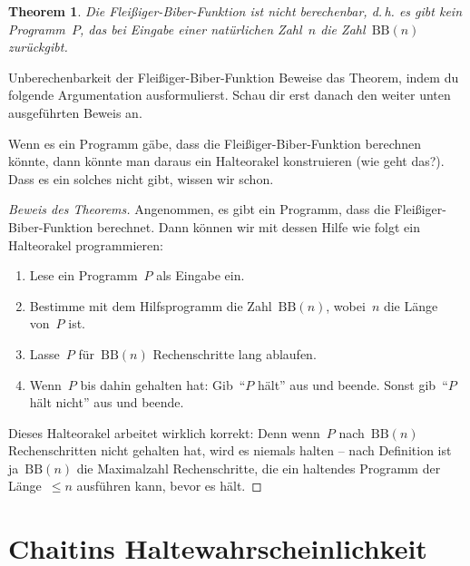 \documentclass[twoside]{../zirkelblatt1415}
\theoremstyle{definition}
\theoremstyle{plain}
\newtheorem{thm}[defn]{Theorem}
\theoremstyle{remark}
\newenvironment{listing}{
  \renewcommand*\theenumi{\arabic{enumi}}
  \renewcommand{\labelenumi}{\theenumi.}
  \begin{enumerate}\itemsep0em}{\end{enumerate}}
\newcommand{\BB}{\mathrm{BB}}
\begin{document}
\begin{thm}Die Fleißiger-Biber-Funktion ist nicht berechenbar, d.\,h. es gibt
kein Programm~$P$, das bei Eingabe einer natürlichen Zahl~$n$ die Zahl~$\BB(n)$
zurückgibt.\end{thm}

\begin{aufgabe}{Unberechenbarkeit der Fleißiger-Biber-Funktion}
\label{aufg:bb}
Beweise das Theorem, indem du folgende Argumentation ausformulierst. Schau dir
erst danach den weiter unten ausgeführten Beweis an.

Wenn es ein Programm gäbe, dass die Fleißiger-Biber-Funktion
berechnen könnte, dann könnte man daraus ein Halteorakel konstruieren (wie geht
das?). Dass es ein solches nicht gibt, wissen wir schon.
\end{aufgabe}

\begin{proof}[Beweis des Theorems]
Angenommen, es gibt ein Programm, dass die Fleißiger-Biber-Funktion
berechnet. Dann können wir mit dessen Hilfe wie folgt ein Halteorakel programmieren:
\begin{listing}
\item Lese ein Programm~$P$ als Eingabe ein.
\item Bestimme mit dem Hilfsprogramm die Zahl~$\BB(n)$, wobei~$n$ die Länge
von~$P$ ist.
\item Lasse~$P$ für~$\BB(n)$ Rechenschritte lang ablaufen.
\item Wenn~$P$ bis dahin gehalten hat: Gib~"`$P$ hält"' aus und beende.
Sonst gib~"`$P$ hält nicht"' aus und beende.
\end{listing}
Dieses Halteorakel arbeitet wirklich korrekt: Denn wenn~$P$ nach~$\BB(n)$
Rechenschritten nicht gehalten hat, wird es niemals halten -- nach Definition
ist ja~$\BB(n)$ die Maximalzahl Rechenschritte, die ein haltendes Programm der
Länge~$\leq n$ ausführen kann, bevor es hält.
\end{proof}


\section{Chaitins Haltewahrscheinlichkeit}
\end{document}
